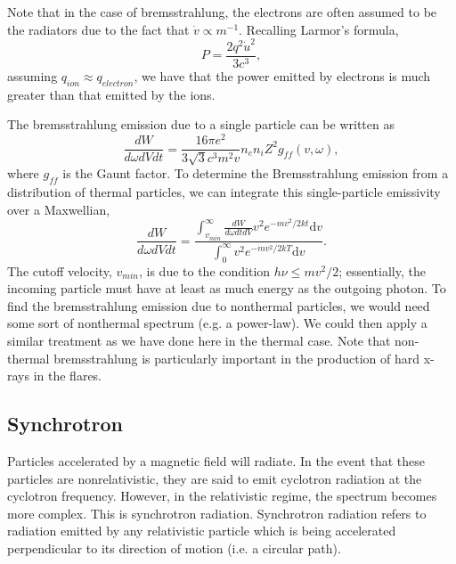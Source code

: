	Note that in the case of bremsstrahlung, the electrons are often assumed to be the radiators due to the fact that $\dot{v}\propto m^{-1}$. Recalling Larmor's formula,
	\begin{equation}
		P=\frac{2q^2\dot{u}^2}{3c^3},
	\end{equation}
	assuming $q_{ion}\approx q_{electron}$, we have that the power emitted by electrons is much greater than that emitted by the ions. 
	
	The bremsstrahlung emission due to a single particle can be written as 
	\begin{equation}
		\frac{dW}{d\omega dVdt} = \frac{16\pi e^2}{3\sqrt{3}c^3m^2v}n_en_iZ^2g_{ff}(v,\omega),
	\end{equation}
	where $g_{ff}$ is the Gaunt factor. To determine the Bremsstrahlung emission from a distribution of thermal particles, we can integrate this single-particle emissivity over a Maxwellian,
	\begin{equation}
		\frac{dW}{d\omega dV dt} = \frac{\int_{v_{min}}^{\infty}\frac{dW}{d\omega dt dV}v^2e^{-mv^2/2kt}\mathrm{d}v}{\int_0^{\infty}v^2e^{-mv^2/2kT}\mathrm{d}v}.
	\end{equation}
	The cutoff velocity, $v_{min}$, is due to the condition $h\nu\le mv^2/2$; essentially, the incoming particle must have at least as much energy as the outgoing photon. To find the bremsstrahlung emission due to nonthermal particles, we would need some sort of nonthermal spectrum (e.g. a power-law). We could then apply a similar treatment as we have done here in the thermal case. Note that non-thermal bremsstrahlung is particularly important in the production of hard x-rays in the flares. 

	\subsection{Synchrotron}
	Particles accelerated by a magnetic field will radiate. In the event that these particles are nonrelativistic, they are said to emit cyclotron radiation at the cyclotron frequency. However, in the relativistic regime, the spectrum becomes more complex. This is synchrotron radiation. Synchrotron radiation refers to radiation emitted by any relativistic particle which is being accelerated perpendicular to its direction of motion (i.e. a circular path). 
	
